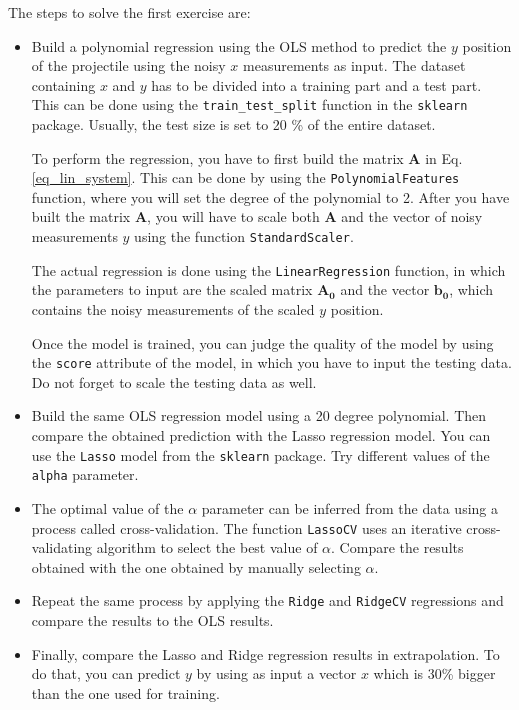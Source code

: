 \documentclass[11pt]{article}
\begin{document}
\begin{enumerate}[start=1,label={\bfseries Task \arabic*:}]
The steps to solve the first exercise are:
\begin{itemize}
\item Build a polynomial regression using the OLS method to predict the $y$ position of the projectile using the noisy $x$ measurements as input. The dataset containing $x$ and $y$ has to be divided into a training part and a test part. This can be done using the \verb|train_test_split| function in the \verb|sklearn| package. Usually, the test size is set to 20 \% of the entire dataset. \par
To perform the regression, you have to first build the matrix $\mathbf{A}$ in Eq. \ref{eq_lin_system}. This can be done by using the \verb|PolynomialFeatures| function, where you will set the degree of the polynomial to 2. After you have built the matrix $\mathbf{A}$, you will have to scale both $\mathbf{A}$ and the vector of noisy measurements $y$ using the function \verb|StandardScaler|. \par
The actual regression is done using the \verb|LinearRegression| function, in which the parameters to input are the scaled matrix $\mathbf{A_0}$ and the vector $\mathbf{b_0}$, which contains the noisy measurements of the scaled $y$ position. \par
Once the model is trained, you can judge the quality of the model by using the \verb|score| attribute of the model, in which you have to input the testing data. Do not forget to scale the testing data as well.
\item Build the same OLS regression model using a 20 degree polynomial. Then compare the obtained prediction with the Lasso regression model. You can use the \verb|Lasso| model from the \verb|sklearn| package. Try different values of the \verb|alpha| parameter.
\item The optimal value of the $\alpha$ parameter can be inferred from the data using a process called cross-validation. The function \verb|LassoCV| uses an iterative cross-validating algorithm to select the best value of $\alpha$. Compare the results obtained with the one obtained by manually selecting $\alpha$.
\item Repeat the same process by applying the \verb|Ridge| and \verb|RidgeCV| regressions and compare the results to the OLS results.
\item Finally, compare the Lasso and Ridge regression results in extrapolation. To do that, you can predict $y$ by using as input a vector $x$ which is 30\% bigger than the one used for training.
\end{itemize}


\end{enumerate}
\end{document}
